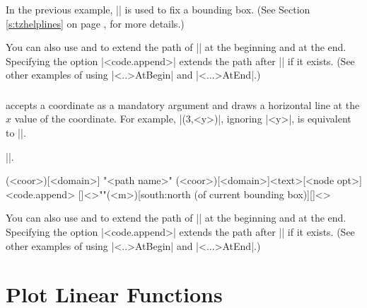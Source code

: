 In the previous example, |\tzhelplines*| is used to fix a bounding box. (See Section \ref{s:tzhelplines} on page \pageref{s:tzhelplines}, for more details.)

You can also use \icmd{\tzvfnatAtBegin} and \icmd{\tzvfnatAtEnd} to extend the path of |\tzvfnat| at the beginning and at the end. Specifying the option |<code.append>| extends the path after |\tzvfnatAtEnd| if it exists.
(See other examples of using |\tz<..>AtBegin| and |\tz<...>AtEnd|.)

\subsection{\protect\cmd{\tzvfn}}
\label{ss:tzvfn}

\icmd{\tzvfn} accepts a coordinate as a mandatory argument and draws a horizontal line at the $x$ value of the coordinate.
For example, |\tzvfn(3,<y>)|, ignoring |<y>|, is equivalent to ||.

 |\tzvfnat|.

\begin{tzdef}
\tzvfn(<coor>)[<domain>]
"<path name>"
      (<coor>)[<domain>]{<text>}[<node opt>]<code.append>
  []<>""(<m>)[south:north (of current bounding box)]{}[]<>
\end{tzdef}

\begin{tzcode}{.3}
\end{tzcode}

You can also use \icmd{\tzvfnAtBegin} and \icmd{\tzvfnAtEnd} to extend the path of |\tzvfn| at the beginning and at the end. Specifying the option |<code.append>| extends the path after |\tzvfnAtEnd| if it exists.
(See other examples of using |\tz<..>AtBegin| and |\tz<...>AtEnd|.)





\chapter{Plot Linear Functions}
\label{c:linearfunctions}


